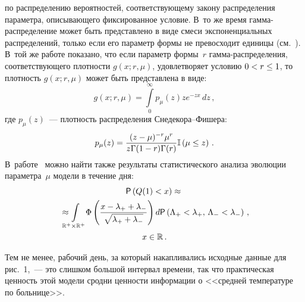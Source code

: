 \begin{multicols}{2}
\noindent
 по распределению вероятностей,
соответствующему закону распределения параметра, описывающего
фиксированное условие. В~то же время гам\-ма-рас\-пре\-де\-ле\-ние может быть
представлено в виде смеси экспоненциальных распределений, только
если его параметр формы не превосходит единицы (см.~\cite{Gleser1987}). 
В~той же работе показано, что если па\-ра\-метр
формы~$r$ гам\-ма-рас\-пре\-де\-ле\-ния, соответствующего плот\-ности
$g(x;r,\mu)$, удовлетворяет условию $0\hm<r\hm\leq 1$, то плот\-ность
$g(x;r,\mu)$ может быть представлена в виде:
$$
g(x;r,\mu)=\int\limits_{0}^{\infty}p_\mu(z) z e^{-zx}\,dz\,,
$$
где $p_\mu(z)$~--- плотность распределения Сне\-де\-ко\-ра--Фи\-ше\-ра:
$$
p_\mu(z) =\displaystyle\frac{\displaystyle (z-\mu)^{-r}\mu^r\mathstrut}{\displaystyle z\Gamma(1-r)\Gamma(r)\mathstrut} \mathbb{I}\left(\mu\leq
z\right)\,.
$$
В~работе~\cite{GorsheninDoynikovKorolevKuzmin2012} можно найти также
результаты статистического анализа эволюции па\-ра\-мет\-ра~$\mu$ 
модели в течение дня:
\begin{multline}
{\sf
P}\left(Q(1)<x\right)\approx{}\\
{}\approx\!\!\!\!\!\int\limits_{\mathbb{R^+}\times\mathbb{R^+}}\!\!
\Phi\left(\displaystyle\frac{\displaystyle x-\lambda_+ +\lambda_-\mathstrut}{\displaystyle \sqrt{\lambda_++\lambda_-}\mathstrut}\right)d
{\sf P}\left(\Lambda_+<\lambda_+,\,\Lambda_-<\lambda_-\right)\,,\\
x\in\mathbb{R}\,.
\label{e2-ch}
\end{multline}

Тем не менее, рабочий день, за который накапливались исходные данные
для рис.~1,~--- это слишком большой интервал
времени, так что практическая ценность этой модели сродни ценности
информации о <<средней температуре по больнице>>.


\end{multicols}
